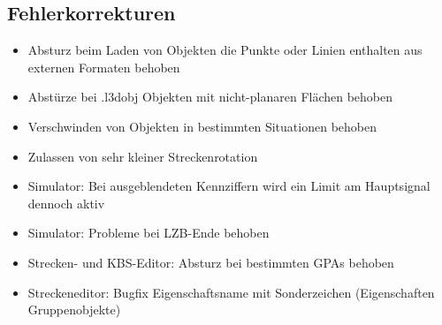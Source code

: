 \subsection{Fehlerkorrekturen}
\begin{itemize}
\item Absturz beim Laden von Objekten die Punkte oder Linien enthalten aus externen Formaten behoben
\item Abstürze bei .l3dobj Objekten mit nicht-planaren Flächen behoben
\item Verschwinden von Objekten in bestimmten Situationen behoben
\item Zulassen von sehr kleiner Streckenrotation
\item Simulator: Bei ausgeblendeten Kennziffern wird ein Limit am Hauptsignal dennoch aktiv
\item Simulator: Probleme bei LZB-Ende behoben
\item Strecken- und KBS-Editor: Absturz bei bestimmten GPAs behoben
\item Streckeneditor: Bugfix Eigenschaftsname mit Sonderzeichen (Eigenschaften Gruppenobjekte)
\end{itemize}
